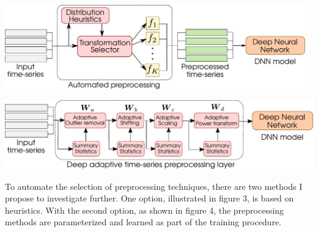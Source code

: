 \documentclass[portrait,final,x11names,a1paper,fontscale=0.4]{baposter}
\begin{document}
\begin{poster}
{\noindent
\begin{minipage}{.975\textwidth}
    \vspace*{-.3cm}
    \begin{center}
    \includegraphics[width=0.975\textwidth]{Figures/automated-preprocessing-heuristics.pdf} 
    \end{center}
\end{minipage}
\begin{minipage}{.975\textwidth}
    \vspace*{-.15cm}
    \begin{center}
    \includegraphics[width=\textwidth]{Figures/automated-preprocessing-adaptive.pdf} 
    \end{center}
    \vspace*{-.15cm}
\end{minipage}

\noindent
To automate the selection of preprocessing techniques, there are two methods I propose to investigate
further. One option, illustrated in figure 3, is based on heuristics. With the second option, as shown in figure 4,
the preprocessing methods are parameterized and learned as part of the training procedure.
}


\end{poster}
\end{document}
